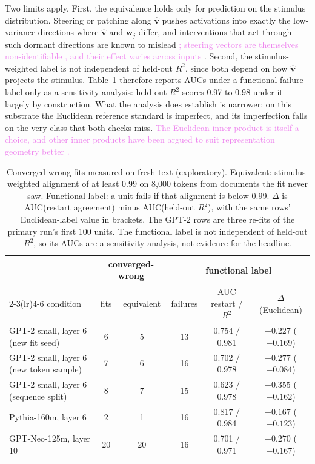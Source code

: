 \documentclass[10pt]{article}
\newcommand{\draft}[1]{\textcolor{violet}{#1}}
\begin{document}
Two limits apply. First, the equivalence holds only for prediction on the stimulus
distribution. Steering or patching along $\hat{\mathbf{v}}$ pushes activations into exactly the low-variance directions
where $\hat{\mathbf{v}}$ and $\mathbf{w}_j$ differ, and interventions that act through such
dormant directions are known to mislead \citep{makelov2024subspace}\draft{; steering vectors are
themselves non-identifiable \citep{venkatesh2026steering}, and their effect varies across inputs
\citep{braun2025unreliability}}. Second, the
stimulus-weighted label is not independent of held-out $R^2$, since both depend on how
$\hat{\mathbf{v}}$ projects the stimulus. Table~\ref{tab:functional} therefore reports AUCs
under a functional failure label only as a sensitivity analysis: held-out $R^2$ scores 0.97 to
0.98 under it largely by construction. What the analysis does establish is narrower: on this
substrate the Euclidean reference standard is imperfect, and its imperfection falls on the very
class that both checks miss. \draft{The Euclidean inner product is itself a choice, and other
inner products have been argued to suit representation geometry better
\citep{park2024linear}.}

\begin{table}[t]
\centering
\small
\begin{tabular}{lccccc}
\toprule
& \multicolumn{2}{c}{converged-wrong} & \multicolumn{3}{c}{functional label} \\
\cmidrule(lr){2-3}\cmidrule(lr){4-6}
condition & fits & equivalent & failures & AUC restart / $R^2$ & $\Delta$ (Euclidean) \\
\midrule
GPT-2 small, layer 6 (new fit seed) & 6 & 5 & 13 & 0.754 / 0.981 & $-0.227$ ($-0.169$) \\
GPT-2 small, layer 6 (new token sample) & 7 & 6 & 16 & 0.702 / 0.978 & $-0.277$ ($-0.084$) \\
GPT-2 small, layer 6 (sequence split) & 8 & 7 & 15 & 0.623 / 0.978 & $-0.355$ ($-0.162$) \\
Pythia-160m, layer 6 & 2 & 1 & 16 & 0.817 / 0.984 & $-0.167$ ($-0.123$) \\
GPT-Neo-125m, layer 10 & 20 & 20 & 16 & 0.701 / 0.971 & $-0.270$ ($-0.167$) \\
\bottomrule
\end{tabular}
\caption{Converged-wrong fits measured on fresh text (exploratory). Equivalent: stimulus-weighted alignment
of at least 0.99 on 8{,}000 tokens from documents the fit never saw. Functional label: a unit
fails if that alignment is below 0.99. $\Delta$ is AUC(restart agreement) minus AUC(held-out
$R^2$), with the same rows' Euclidean-label value in brackets. The GPT-2 rows are three
re-fits of the primary run's first 100 units. The functional label is not independent of
held-out $R^2$, so its AUCs are a sensitivity analysis, not evidence for the headline.}
\label{tab:functional}
\end{table}
\end{document}
